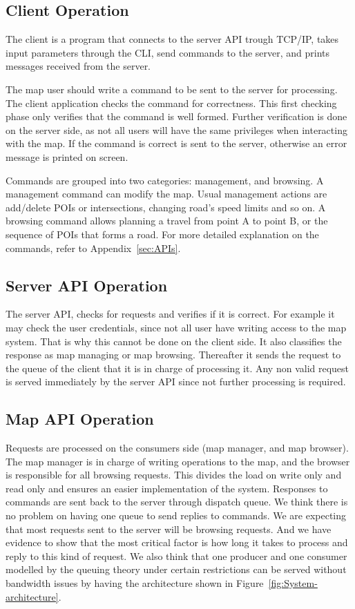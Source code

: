 \documentclass[10pt]{article}
\begin{document}
\subsection{Client Operation}
The client is a program that connects to the server API trough TCP/IP, takes
input parameters through the CLI, send commands to the server, and prints
messages received from the server.

The map user should write a command to be sent to the server for processing. The
client application checks the command for correctness. This first checking phase
only verifies that the command is well formed. Further verification is done on
the server side, as not all users will have the same privileges when interacting
with the map. If the command is correct is sent to the server, otherwise an
error message is printed on screen. 

Commands are grouped into two categories: management, and browsing. A management
command can modify the map. Usual management actions are add/delete POIs or
intersections, changing road's speed limits and so on. A  browsing command
allows planning a travel from point A to point B, or the sequence of POIs that
forms a road. For more detailed explanation on the commands, refer to Appendix~\ref{sec:APIs}.

\subsection{Server API Operation}
The server API, checks for requests and verifies if it is correct. For example
it may check the user credentials, since not all user have writing access to the
map system. That is why this cannot be done on the client side. It also
classifies the response as map managing or map browsing. Thereafter it sends the
request to the queue of the client that it is in charge of processing it. Any
non valid request is served immediately by the server API since not further
processing is required.

\subsection{Map API Operation}
Requests are processed on the consumers side (map manager, and map browser).
The map manager is in charge of writing operations to the map, and the browser
is responsible for all browsing requests. This divides the load on write only
and read only and ensures an easier implementation of the system. Responses to
commands are sent back to the server through dispatch queue. We think there is
no problem on having one queue to send replies to commands. We are expecting
that most requests sent to the server will be browsing requests. And we have
evidence to show that the most critical factor is how long it takes to process
and reply to this kind of request. We also think that one producer and one
consumer modelled by the queuing theory under certain restrictions can be served
without bandwidth issues by having the architecture shown in Figure~\ref{fig:System-architecture}.
\end{document}
